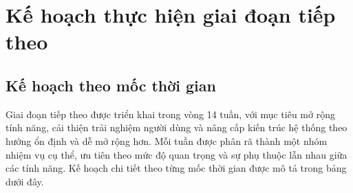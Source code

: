 \newpage
\section{Kế hoạch thực hiện giai đoạn tiếp theo}
\subsection{Kế hoạch theo mốc thời gian}

Giai đoạn tiếp theo được triển khai trong vòng 14 tuần, với mục tiêu mở rộng tính năng,
cải thiện trải nghiệm người dùng và nâng cấp kiến trúc hệ thống theo hướng ổn định và
dễ mở rộng hơn. Mỗi tuần được phân rã thành một nhóm nhiệm vụ cụ thể, ưu tiên theo
mức độ quan trọng và sự phụ thuộc lẫn nhau giữa các tính năng. Kế hoạch chi tiết
theo từng mốc thời gian được mô tả trong bảng dưới đây.

